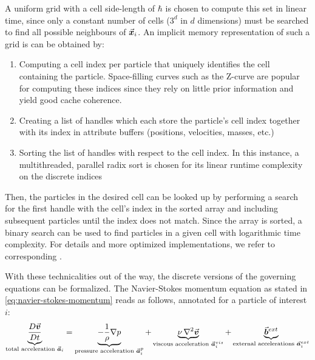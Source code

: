 A uniform grid with a cell side-length of $\hbar$ is chosen to compute this set in linear time, since only a constant number of cells ($3^d$ in $d$ dimensions) must be searched to find all possible neighbours of $\vec{\bm{x}}_i$. An implicit memory representation of such a grid is can be obtained by:
\begin{enumerate}
  \item Computing a cell index per particle that uniquely identifies the cell containing the particle. Space-filling curves such as the Z-curve are popular for computing these indices since they rely on little prior information and yield good cache coherence\autocite*{2014-sph-sruvey-eurographics}.
  \item Creating a list of handles which each store the particle's cell index together with its index in attribute buffers (positions, velocities, masses, etc.)
  \item Sorting the list of handles with respect to the cell index. In this instance, a multithreaded, parallel radix sort is chosen for its linear runtime complexity on the discrete indices
\end{enumerate}
Then, the particles in the desired cell can be looked up by performing a search for the first handle with the cell's index in the sorted array and including subsequent particles until the index does not match. Since the array is sorted, a binary search can be used to find particles in a given cell with logarithmic time complexity. For details and more optimized implementations, we refer to corresponding \cite[Literature]{compressed-neighbour-lists}.

With these technicalities out of the way, the discrete versions of the governing equations can be formalized. The Navier-Stokes momentum equation as stated in \autoref{eq:navier-stokes-momentum} reads as follows, annotated for a particle of interest $i$:
\begin{equation}
  \underbrace{\frac{D\vec{\bm{v}}}{Dt}}_{\text{total acceleration }\vec{\bm{a}}_i}=\underbrace{-\frac{1}{\rho}\nabla p}_{\text{pressure acceleration } \vec{\bm{a}}_i^{p}}+\underbrace{\nu\mathop{}\!\mathbin\nabla^2\vec{\bm{v}}}_{\text{viscous acceleration } \vec{\bm{a}}_i^{vis}}+\underbrace{\vec{\bm{b}}^{ext}}_{\text{external accelerations } \vec{\bm{a}}_i^{ext}}
\end{equation}

